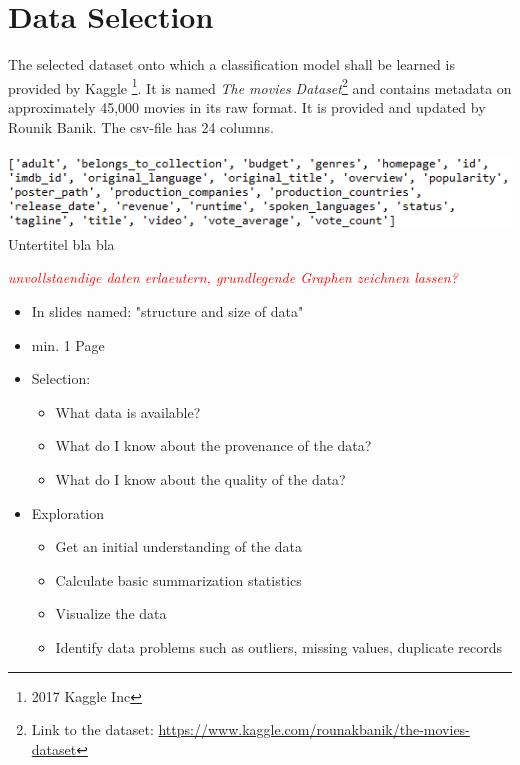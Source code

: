 \chapter{Data Selection}
\label{cha:data_selection}
The selected dataset onto which a classification model shall be learned is provided by Kaggle \footnote{2017 Kaggle Inc}. It is named \textit{The movies Dataset}\footnote{Link to the dataset: \hyperref[https://www.kaggle.com/rounakbanik/the-movies-dataset]{https://www.kaggle.com/rounakbanik/the-movies-dataset}} and contains metadata on approximately 45,000 movies in its raw format. It is provided and updated by Rounik Banik. The csv-file has 24 columns.\\\\
\includegraphics[width=\textwidth]{images/Raw_dataset_headers.png}
Untertitel bla bla


\textcolor{red}{\textit{unvollstaendige daten erlaeutern, grundlegende Graphen zeichnen lassen?}}




\begin{itemize}
	\item In slides named: "structure and size of data"
	\item min. 1 Page
	\item Selection: 
	\begin{itemize}
		\item What data is available?
		\item What do I know about the provenance of the data?
		\item What do I know about the quality of the data?
	\end{itemize}
	\item Exploration
	\begin{itemize}
		\item Get an initial understanding of the data
		\item Calculate basic summarization statistics
		\item Visualize the data
		\item Identify data problems such as outliers, missing values, duplicate records
	\end{itemize}
\end{itemize}



